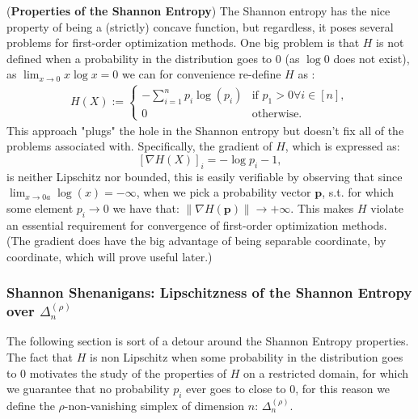 \begin{observation}
    (\textbf{Properties of the Shannon Entropy}) The Shannon entropy has the nice property of being a (strictly) concave function, but regardless, it poses several problems for first-order optimization methods. One big problem is that $H$ is not defined when a probability in the distribution goes to $0$ (as $\log 0$ does not exist), as $\lim_{x \rightarrow 0} x \log x = 0$ we can for convenience re-define $H$ as : 
    \begin{align*}
        H(X) := \begin{cases}
            - \sum^n_{i=1}p_i \log(p_i) & \text{if } p_1 >0 \forall i \in [n], \\
            0 & \text{otherwise. } 
        \end{cases}
    \end{align*}
    This approach "plugs" the hole in the Shannon entropy but doesn't fix all of the problems associated with. Specifically, the gradient of $H$, which is expressed as:
    \[ [\nabla H (X)]_i = - \log p_i - 1, \]
    is neither Lipschitz nor bounded, this is easily verifiable by observing that since $\lim_{x\rightarrow 0 a} \log(x) = -\infty$, when we pick a probability vector $\bm{p}$, s.t. for which some element $p_i \rightarrow 0$ we have that: $\| \nabla H (\bm{p})\| \rightarrow + \infty$. This makes $H$ violate an essential requirement for convergence of first-order optimization methods.
    (The gradient does have the big advantage of being separable coordinate, by coordinate, which will prove useful later.)
\end{observation}

\subsubsection{Shannon Shenanigans: Lipschitzness of the Shannon Entropy over $\Delta^{(\rho)}_n$}

The following section is sort of a detour around the Shannon Entropy properties. The fact that $H$ is non Lipschitz when some probability in the distribution goes to $0$ motivates the study of the properties of $H$ on a restricted domain, for which we guarantee that no probability $p_i$ ever goes to close to $0$, for this reason we define the $\rho$-non-vanishing simplex of dimension $n$: $\Delta^{(\rho)}_n$.

